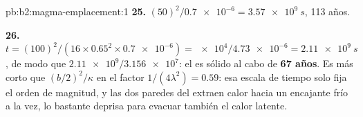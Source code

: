 \begin{solution}{pb:b2:magma-emplacement:1}
\textbf{25.} $(50)^2/\num{0.7e-6} = \qty{3.57e9}{s}$, 113 años.

\textbf{26.} $t = (100)^2/(16\times0.65^2\times\num{0.7e-6}) = \num{e4}/\num{4.73e-6} =
\qty{2.11e9}{s}$, de modo que $\num{2.11e9}/\num{3.156e7}$: el  es sólido al cabo de
\textbf{\qty[text-series-to-math=true]{67}{} años}. Es más corto que
$(b/2)^2/\kappa$ en el factor $1/(4\lambda^2) = 0.59$: esa escala de tiempo solo fija
el orden de magnitud, y las dos paredes del  extraen calor hacia un encajante frío a
la vez, lo bastante deprisa para evacuar también el calor latente.
\end{solution}
